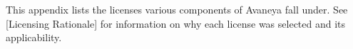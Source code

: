 

This appendix lists the licenses various components of Avaneya fall under. See [Licensing Rationale] for information on why each license was selected and its applicability.

\page
{}


\page
{}


\page
{}


\page
{}


\StopChapter

